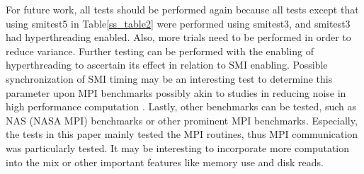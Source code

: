 \documentclass{IEEEtran}
\begin{document}
For future work, all tests should be performed again because all tests except that using smitest5 in Table\ref{ss_table2} were performed using smitest3, and smitest3 had hyperthreading enabled. Also, more trials need to be performed in order to reduce variance. Further testing can be performed with the enabling of hyperthreading to ascertain its effect in relation to SMI enabling. Possible synchronization of SMI timing may be an interesting test to determine this parameter upon MPI benchmarks possibly akin to studies in reducing noise in high performance computation 
\emph{\cite{NHPC}}. Lastly, other benchmarks can be tested, such as NAS (NASA MPI) benchmarks or other prominent MPI benchmarks. Especially, the tests in this paper mainly tested the MPI routines, thus MPI communication was particularly tested. It may be interesting to incorporate more computation into the mix or other important features like memory use and disk reads.

\end{document}
